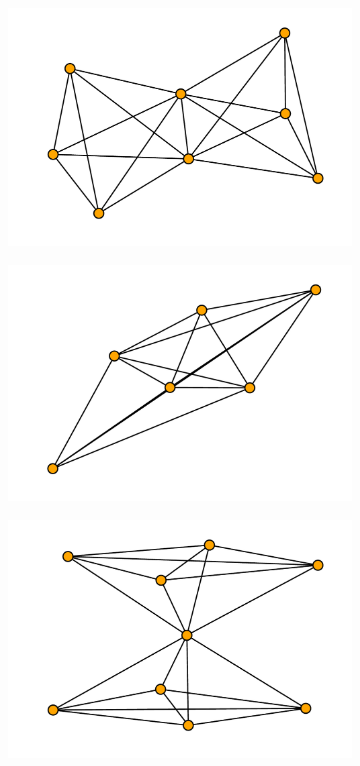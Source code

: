 \documentclass{article}
\begin{document}
\begin{figure}[!hbtp]
\begin{subfigure}{0.3\textwidth}
    \end{subfigure}
    \begin{subfigure}{0.3\textwidth}
        \includegraphics[width=\textwidth]{./assets/images/coauthor03.pdf}
    \end{subfigure}
    \begin{subfigure}{0.3\textwidth}
        \includegraphics[width=\textwidth]{./assets/images/coauthor04.pdf}
    \end{subfigure}
    \begin{subfigure}{0.3\textwidth}
        \includegraphics[width=\textwidth]{./assets/images/coauthor05.pdf}

\end{subfigure}
\end{figure}
\end{document}
